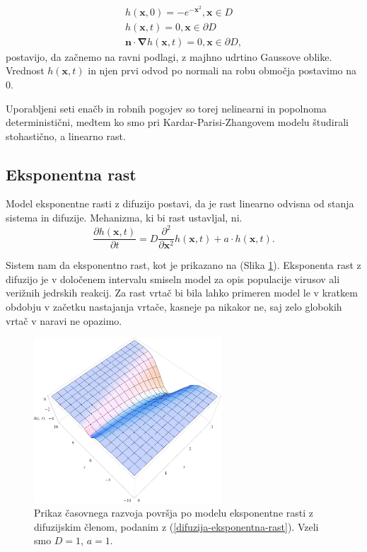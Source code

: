 \documentclass[a4paper, twoside, 12pt]{book}
\begin{document}
    \begin{equation}
      \begin{aligned}
        h(\mathbf{x},0) =  - e^{-\mathbf{x}^2}, \mathbf{x} \in D \\
        h(\mathbf{x},t) = 0, \mathbf{x} \in \partial D \\
        \mathbf{n} \cdot \boldsymbol \nabla h(\mathbf{x},t) = 0, \mathbf{x} \in \partial D,
      \end{aligned}
\label{rd-robni}
    \end{equation}
postavijo, da začnemo na ravni podlagi, z majhno udrtino Gaussove oblike. Vrednost $h(\mathbf{x},t)$ in njen prvi odvod po normali na robu območja postavimo na $0$.

Uporabljeni seti enačb in robnih pogojev so torej nelinearni in popolnoma deterministični, medtem ko smo pri Kardar-Parisi-Zhangovem modelu študirali stohastično, a linearno rast.
    \subsection{Eksponentna rast}

Model eksponentne rasti z difuzijo postavi, da je rast linearno odvisna od stanja sistema in difuzije. Mehanizma, ki bi rast ustavljal, ni.
    \begin{equation}
      \frac{ \partial h(\mathbf{x},t) }{ \partial t} = D \frac{\partial^2}{\partial \mathbf{x}^2} h(\mathbf{x},t) + a \cdot h(\mathbf{x},t).
      \label{difuzija-eksponentna-rast}
    \end{equation}

Sistem nam da eksponentno rast, kot je prikazano na (Slika \ref{fig:difuzija-eksponentna-rast}).
Eksponenta rast z difuzijo je v določenem intervalu smiseln model za opis populacije virusov ali verižnih jedrskih reakcij. Za rast vrtač bi bila lahko primeren model le v kratkem obdobju v začetku nastajanja vrtače, kasneje pa nikakor ne, saj zelo globokih vrtač v naravi ne opazimo.
    \begin{figure}[h!]
      \begin{center}
        \includegraphics[width=7cm]{slike/difuzija-eksponentna-rast2}
      \end{center}
      \caption{Prikaz časovnega razvoja površja po modelu eksponentne rasti z difuzijskim členom, podanim z (\ref{difuzija-eksponentna-rast}). Vzeli smo $D=1$, $a=1$.}
      \label{fig:difuzija-eksponentna-rast}
    \end{figure}
\end{document}
